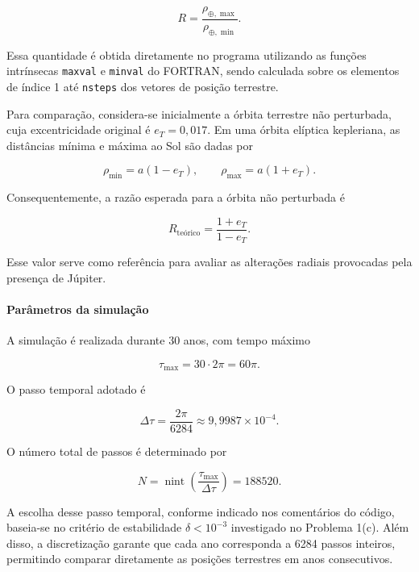 \documentclass[12pt,a4paper]{article}
\begin{document}
\begin{equation}
    R=
    \frac{\rho_{\oplus,\max}}
    {\rho_{\oplus,\min}}.
\end{equation}

Essa quantidade é obtida diretamente no programa utilizando as funções intrínsecas \texttt{maxval} e \texttt{minval} do FORTRAN, sendo calculada sobre os elementos de índice 1 até \texttt{nsteps} dos vetores de posição terrestre.

Para comparação, considera-se inicialmente a órbita terrestre não perturbada, cuja excentricidade original é $e_T=0,017$. Em uma órbita elíptica kepleriana, as distâncias mínima e máxima ao Sol são dadas por

\begin{equation}
    \rho_{\min}=a(1-e_T),
    \qquad
    \rho_{\max}=a(1+e_T).
\end{equation}

Consequentemente, a razão esperada para a órbita não perturbada é

\begin{equation}
    R_{\mathrm{teórico}}
    =
    \frac{1+e_T}{1-e_T}.
\end{equation}

Esse valor serve como referência para avaliar as alterações radiais provocadas pela presença de Júpiter.

\paragraph{Parâmetros da simulação}

A simulação é realizada durante 30 anos, com tempo máximo

\begin{equation}
    \tau_{\max}=30\cdot2\pi=60\pi.
\end{equation}

O passo temporal adotado é

\begin{equation}
    \Delta\tau=\frac{2\pi}{6284}
    \approx9,9987\times10^{-4}.
\end{equation}

O número total de passos é determinado por

\begin{equation}
    N=\operatorname{nint}
    \left(
    \frac{\tau_{\max}}{\Delta\tau}
    \right)
    =188520.
\end{equation}

A escolha desse passo temporal, conforme indicado nos comentários do código, baseia-se no critério de estabilidade $\delta<10^{-3}$ investigado no Problema 1(c). Além disso, a discretização garante que cada ano corresponda a 6284 passos inteiros, permitindo comparar diretamente as posições terrestres em anos consecutivos.
\end{document}
